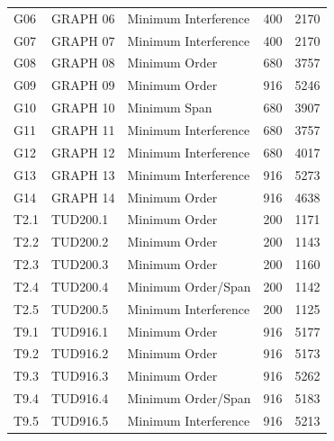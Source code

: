 \documentclass[letterpaper,journal]{IEEEtran}
\begin{document}
\begin{table}[!htbp]
\begin{tabular}{@{}llp{}rr@{}}
G06 & GRAPH 06 & Minimum Interference & 400 & 2170 \\
G07 & GRAPH 07 & Minimum Interference & 400 & 2170 \\
G08 & GRAPH 08 & Minimum Order & 680 & 3757 \\
G09 & GRAPH 09 & Minimum Order & 916 & 5246 \\
G10 & GRAPH 10 & Minimum Span & 680 & 3907 \\
G11 & GRAPH 11 & Minimum Interference & 680 & 3757 \\
G12 & GRAPH 12 & Minimum Interference & 680 & 4017 \\
G13 & GRAPH 13 & Minimum Interference & 916 & 5273 \\
G14 & GRAPH 14 & Minimum Order & 916 & 4638 \\
T2.1 & TUD200.1 & Minimum Order & 200 & 1171 \\
T2.2 & TUD200.2 & Minimum Order & 200 & 1143 \\
T2.3 & TUD200.3 & Minimum Order & 200 & 1160 \\
T2.4 & TUD200.4 & Minimum Order/Span & 200 & 1142 \\
T2.5 & TUD200.5 & Minimum Interference & 200 & 1125 \\
T9.1 & TUD916.1 & Minimum Order & 916 & 5177 \\
T9.2 & TUD916.2 & Minimum Order & 916 & 5173 \\
T9.3 & TUD916.3 & Minimum Order & 916 & 5262 \\
T9.4 & TUD916.4 & Minimum Order/Span & 916 & 5183 \\
T9.5 & TUD916.5 & Minimum Interference & 916 & 5213 \\
\bottomrule
\end{tabular}
\end{table}
\end{document}
